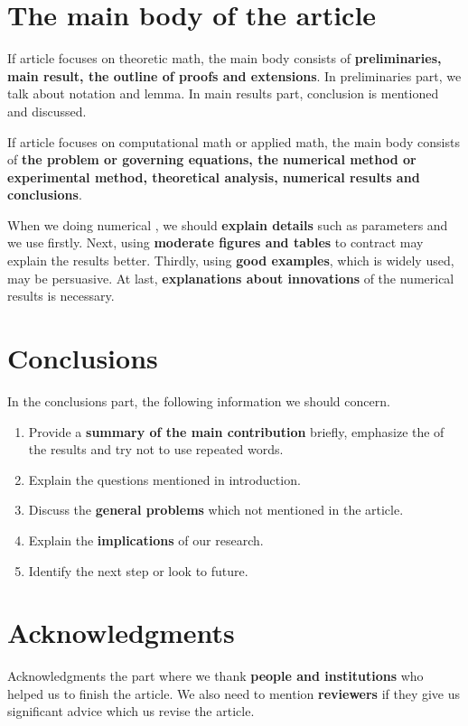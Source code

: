 \section{The main body of the article}
If  article focuses on theoretic math, the main body consists of \textbf{preliminaries, main result, the outline of proofs and extensions}. In  preliminaries part, we talk about notation and lemma. In main results part, conclusion is mentioned and discussed.

If  article focuses on computational math or applied math, the main body consists of \textbf{the problem or governing equations, the numerical method or experimental method, theoretical analysis, numerical results and conclusions}.

When we doing numerical , we should \textbf{explain details} such as parameters and  we use firstly. Next, using \textbf{moderate figures and tables} to contract may explain the results better. Thirdly, using \textbf{good examples}, which is widely used, may be persuasive. At last, \textbf{explanations about innovations} of the numerical results is necessary.



\section{Conclusions}
In the conclusions part, the following information we should concern.
\begin{enumerate}
	\item Provide a \textbf{summary of the main contribution} briefly, emphasize the  of the results and try not to use repeated words.
	\item Explain the questions mentioned in introduction.
	\item Discuss the \textbf{general problems} which not mentioned in the article.
	\item Explain the \textbf{implications} of our research.
	\item Identify the next step or look to  future.
\end{enumerate}



\section{Acknowledgments}
Acknowledgments  the part where we thank  \textbf{people and institutions} who helped us to finish the article. We also need to mention \textbf{reviewers} if they give us significant advice which  us revise the article.



